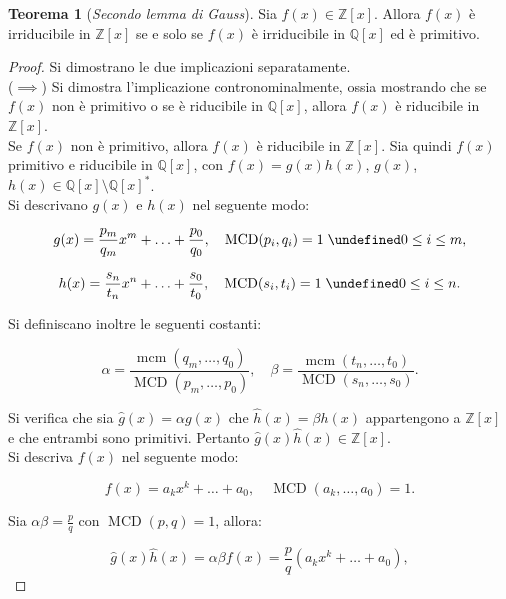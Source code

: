 \documentclass[a4paper]{article}
\newcommand{\QQx}{\mathbb{Q}[x]}
\newcommand{\ZZx}{\mathbb{Z}[x]}
\theoremstyle{definition}
\newtheorem{theorem}{Teorema}[section]
\DeclareMathOperator{\MCD}{MCD}
\DeclareMathOperator{\mcm}{mcm}
\let\oldforall\forall
\let\forall\undefined
\DeclareMathOperator{\forall}{\oldforall}
\begin{document}
\begin{theorem}[\textit{Secondo lemma di Gauss}]
    \label{th:lemma_gauss_2}
    Sia $f(x) \in \ZZx$. Allora $f(x)$ è irriducibile in $\ZZx$
    se e solo se $f(x)$ è irriducibile in $\QQx$ ed è primitivo.
\end{theorem}

\begin{proof} Si dimostrano le due implicazioni separatamente. \\

    ($\implies$)\; Si dimostra l'implicazione contronominalmente,
    ossia mostrando che se $f(x)$ non è primitivo o se è
    riducibile in $\QQx$, allora $f(x)$ è riducibile in $\ZZx$. \\

    Se $f(x)$ non è primitivo, allora
    $f(x)$ è riducibile in $\ZZx$. Sia quindi $f(x)$ primitivo
    e riducibile in $\QQx$, con $f(x)=g(x)h(x)$,
    $g(x)$, $h(x) \in \QQx \setminus \QQx^*$. \\

    Si descrivano $g(x)$ e $h(x)$ nel seguente modo:

    \[ g(x)=\frac{p_m}{q_m} x^m + \ldots + \frac{p_0}{q_0}, \quad \MCD(p_i, q_i)=1 \; \forall 0 \leq i \leq m, \]

    \[ h(x)=\frac{s_n}{t_n} x^n + \ldots + \frac{s_0}{t_0}, \quad
        \MCD(s_i, t_i)=1 \; \forall 0 \leq i \leq n. \]

    \vskip 0.1in

    Si definiscano inoltre le seguenti costanti:

    \[ \alpha = \frac{\mcm(q_m, \ldots, q_0)}{\MCD(p_m, \ldots, p_0)}, \quad \beta = \frac{\mcm(t_n, \ldots, t_0)}{\MCD(s_n, \ldots, s_0)}. \]

    \vskip 0.1in

    Si verifica che sia $\hat{g}(x)=\alpha g(x)$ che
    $\hat{h}(x)=\beta h(x)$ appartengono a $\ZZx$ e che entrambi
    sono primitivi. Pertanto $\hat{g}(x) \hat{h}(x) \in \ZZx$. \\

    Si descriva $f(x)$ nel seguente modo:

    \[ f(x)=a_k x^k + \ldots + a_0, \quad \MCD(a_k,\ldots,a_0)=1. \]

    \vskip 0.1in

    Sia $\alpha \beta = \frac{p}{q}$ con $\MCD(p,q)=1$, allora:

    \[\hat{g}(x) \hat{h}(x) = \alpha \beta f(x) = \frac{p}{q} (a_k x^k + \ldots + a_0), \]


\end{proof}
\end{document}
